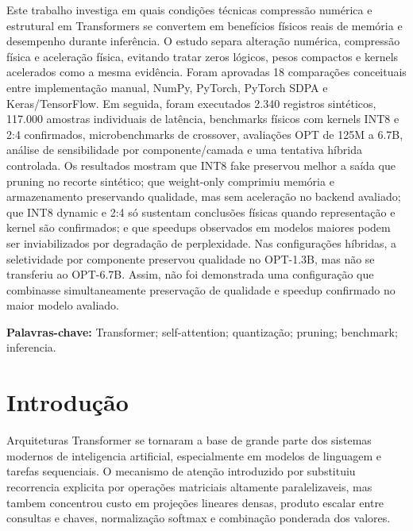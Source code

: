 \documentclass[12pt, a4paper]{article}
\begin{document}
Este trabalho investiga em quais condi\c{c}\~oes t\'ecnicas compress\~ao
num\'erica e estrutural em Transformers se convertem em benef\'icios f\'isicos
reais de mem\'oria e desempenho durante infer\^encia. O estudo separa altera\c{c}\~ao
num\'erica, compress\~ao f\'isica e acelera\c{c}\~ao f\'isica, evitando tratar
zeros l\'ogicos, pesos compactos e kernels acelerados como a mesma evid\^encia.
Foram aprovadas 18 compara\c{c}\~oes conceituais entre implementa\c{c}\~ao manual,
NumPy, PyTorch, PyTorch SDPA e Keras/TensorFlow. Em seguida, foram executados
2.340 registros sint\'eticos, 117.000 amostras individuais de lat\^encia,
benchmarks f\'isicos com kernels INT8 e 2:4 confirmados, microbenchmarks de
crossover, avalia\c{c}\~oes OPT de 125M a 6.7B, an\'alise de sensibilidade por
componente/camada e uma tentativa h\'ibrida controlada. Os resultados mostram
que INT8 fake preservou melhor a sa\'ida que pruning no recorte sint\'etico; que
weight-only comprimiu mem\'oria e armazenamento preservando qualidade, mas sem
acelera\c{c}\~ao no backend avaliado; que INT8 dynamic e 2:4 s\'o sustentam
conclus\~oes f\'isicas quando representa\c{c}\~ao e kernel s\~ao confirmados; e que
speedups observados em modelos maiores podem ser inviabilizados por degrada\c{c}\~ao
de perplexidade. Nas configura\c{c}\~oes h\'ibridas, a seletividade por componente
preservou qualidade no OPT-1.3B, mas n\~ao se transferiu ao OPT-6.7B. Assim,
n\~ao foi demonstrada uma configura\c{c}\~ao que combinasse simultaneamente
preserva\c{c}\~ao de qualidade e speedup confirmado no maior modelo avaliado.

\noindent\textbf{Palavras-chave:} Transformer; self-attention; quantiza\c{c}\~ao; pruning; benchmark; inferencia.

\newpage

\section{Introdu\c{c}\~ao}

Arquiteturas Transformer se tornaram a base de grande parte dos sistemas
modernos de inteligencia artificial, especialmente em modelos de linguagem e
tarefas sequenciais. O mecanismo de aten\c{c}\~ao introduzido por
\textcite{vaswani2017attention} substituiu recorrencia explicita por opera\c{c}\~oes
matriciais altamente paralelizaveis, mas tambem concentrou custo em
proje\c{c}\~oes lineares densas, produto escalar entre consultas e chaves,
normaliza\c{c}\~ao softmax e combina\c{c}\~ao ponderada dos valores.
\end{document}
